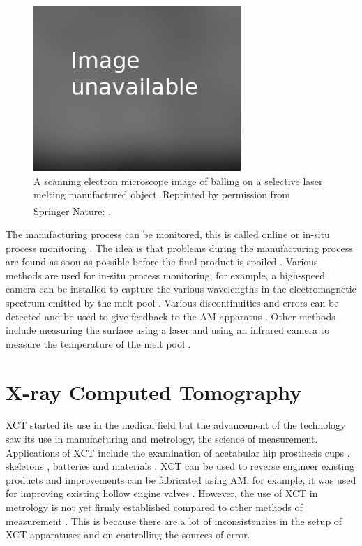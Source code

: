 \begin{figure}
  \centering
  \includegraphics[width=0.7\textwidth]{../figures/literatureReview/literature_balling.png}
  \caption{A scanning electron microscope image of balling on a selective laser melting manufactured object. Reprinted by permission from Springer Nature: \cite{li2012balling}\textsuperscript{\textcopyright}.}
  \label{fig:literature_balling}
\end{figure}

The manufacturing process can be monitored, this is called online or in-situ process monitoring \citep{everton2016review}. The idea is that problems during the manufacturing process are found as soon as possible before the final product is spoiled \citep{cerniglia2015inspection}. Various methods are used for in-situ process monitoring, for example, a high-speed camera can be installed to capture the various wavelengths in the electromagnetic spectrum emitted by the melt pool \citep{berumen2010quality, craeghs2011online, lott2011design}. Various discontinuities and errors can be detected \citep{clijsters2014in} and be used to give feedback to the AM apparatus \citep{herzog2013method}. Other methods include measuring the surface using a laser \citep{cerniglia2015inspection} and using an infrared camera to measure the temperature of the melt pool \citep{rodriguez2012integration}. 

\section{X-ray Computed Tomography}

XCT started its use in the medical field but the advancement of the technology saw its use in manufacturing and metrology, the science of measurement. Applications of XCT include the examination of acetabular hip prosthesis cups \citep{kourra2018computed}, skeletons \citep{appleby2014scoliosis}, batteries \citep{taiwo2017investigating} and materials \citep{zhang2016x, wang2017x}. XCT can be used to reverse engineer existing products and improvements can be fabricated using AM, for example, it was used for improving existing hollow engine valves \citep{cooper2015design}. However, the use of XCT in metrology is not yet firmly established compared to other methods of measurement \citep{thompson2016x}. This is because there are a lot of inconsistencies in the setup of XCT apparatuses and on controlling the sources of error.

